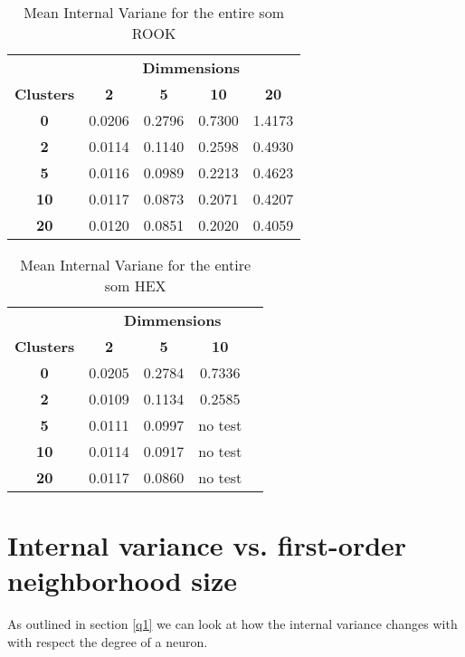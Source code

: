 \begin{table}
\centering
\caption{Mean Internal Variane for the entire som ROOK}
\label{ivtable2}
\begin{tabular}{|c||c|c|c|c|}
\hline
&\multicolumn{4}{c|}{\textbf{Dimmensions}}\\
\textbf{Clusters} & \multicolumn{1}{c}{\textbf{2}} &
\multicolumn{1}{c}{\textbf{5}} & \multicolumn{1}{c}{\textbf{10}} &
\multicolumn{1}{c|}{\textbf{20}}\\
\hline
\hline
\textbf{0} & 0.0206& 0.2796& 0.7300& 1.4173 \\
\hline
\textbf{2} & 0.0114& 0.1140& 0.2598& 0.4930 \\
\hline
\textbf{5} & 0.0116& 0.0989& 0.2213& 0.4623 \\
\hline
\textbf{10} & 0.0117& 0.0873& 0.2071& 0.4207 \\
\hline
\textbf{20} & 0.0120& 0.0851& 0.2020& 0.4059 \\
\hline
\end{tabular} \end{table}

\begin{table}
\caption{Mean Internal Variane for the entire som HEX}
\label{ivtablehex}
\begin{tabular}{|c||c|c|c|c|}
\hline
&\multicolumn{4}{c|}{\textbf{Dimmensions}}\\
\textbf{Clusters} & \multicolumn{1}{c}{\textbf{2}} &
\multicolumn{1}{c}{\textbf{5}} & \multicolumn{1}{c|}{\textbf{10}}\\
\hline
\hline
\textbf{0} & 0.0205& 0.2784& 0.7336 \\
\hline
\textbf{2} & 0.0109& 0.1134& 0.2585 \\
\hline
\textbf{5} & 0.0111& 0.0997& no test \\
\hline
\textbf{10} & 0.0114& 0.0917& no test \\
\hline
\textbf{20} & 0.0117& 0.0860& no test \\
\hline
\end{tabular} \end{table}






\section{Internal variance vs. first-order neighborhood size}
As outlined in section \ref{q1} we can look at how the internal variance
changes with with respect the degree of a neuron.  

